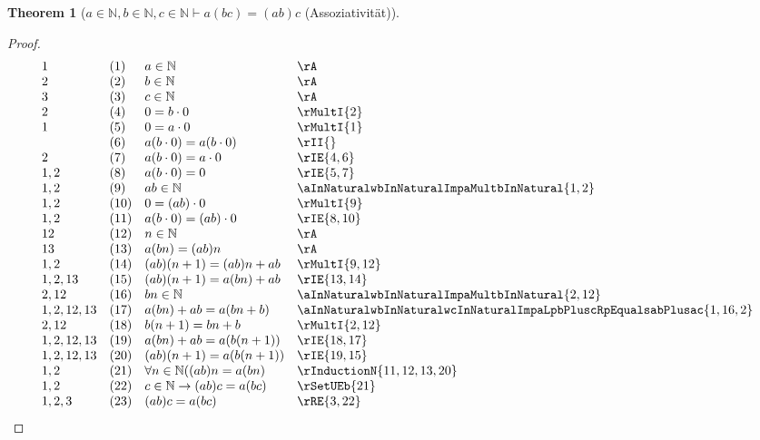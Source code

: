 \documentclass{book}
\theoremstyle{plain}
\newtheorem{theorem}{Theorem}
\theoremstyle{remark}
\theoremstyle{definition}
\begin{document}
\label{aInNaturalwbInNaturalwcInNaturalImpaLpbcRpEqualsLpabRpc}
\begin{theorem}[\(a\in\mathbb{N},b\in\mathbb{N},c\in\mathbb{N}\vdash a(bc)=(ab)c\) (Assoziativität)]
\end{theorem}
\begin{proof}
        \[
	\begin{array}{llll}
            1           &  (1) & a\in\mathbb{N} & \rA \\
            2           &  (2) & b\in\mathbb{N} & \rA \\
            3           &  (3) & c\in\mathbb{N} & \rA \\
            2           &  (4) & 0=b\cdot 0 & \rMultI{2} \\
            1           &  (5) & 0=a\cdot 0 & \rMultI{1} \\
                        &  (6) & a(b\cdot 0)=a(b\cdot 0) & \rII{} \\
            2           &  (7) & a(b\cdot 0)=a\cdot 0 & \rIE{4,6} \\
            1,2         &  (8) & a(b\cdot 0)= 0 & \rIE{5,7} \\
            1,2         &  (9) & ab\in\mathbb{N} & \aInNaturalwbInNaturalImpaMultbInNatural{1,2} \\
            1,2         &  (10) & 0=(ab)\cdot 0 & \rMultI{9} \\
            1,2         &  (11) & a(b\cdot 0)=(ab)\cdot 0 & \rIE{8,10} \\
            12          &  (12) & n\in\mathbb{N} & \rA \\
            13          &  (13) & a(bn)=(ab)n & \rA \\
            1,2         &  (14) & (ab)(n+1)=(ab)n+ab & \rMultI{9,12} \\
            1,2,13      &  (15) & (ab)(n+1)=a(bn)+ab & \rIE{13,14} \\
            2,12        &  (16) & bn\in\mathbb{N} & \aInNaturalwbInNaturalImpaMultbInNatural{2,12}\\
            1,2,12,13   &  (17) & a(bn)+ab=a(bn+b) & \aInNaturalwbInNaturalwcInNaturalImpaLpbPluscRpEqualsabPlusac{1,16,2} \\
            2,12        &  (18) & b(n+1)=bn+b & \rMultI{2,12} \\
            1,2,12,13   &  (19) & a(bn)+ab=a(b(n+1)) & \rIE{18,17} \\
            1,2,12,13   &  (20) & (ab)(n+1)=a(b(n+1)) & \rIE{19,15} \\
            1,2         &  (21) & \forall n\in\mathbb{N}((ab)n=a(bn) & \rInductionN{11,12,13,20} \\
            1,2         &  (22) & c\in\mathbb{N}\rightarrow(ab)c=a(bc) & \rSetUEb{21} \\
            1,2,3       &  (23) & (ab)c=a(bc) & \rRE{3,22} \\
    \end{array}
	\]
\end{proof}
\end{document}
